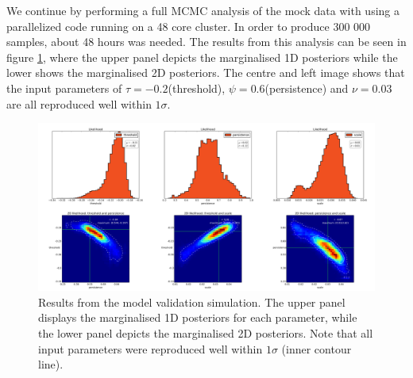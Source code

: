 \documentclass[aps,pre,twocolumn,letterpaper,floatfix,showpacs]{revtex4}
\begin{document}
We continue by performing a full MCMC analysis of the mock data with using a parallelized code running on a 48 core cluster. In order to produce 300 000 samples, about 48 hours was needed. The results from this analysis can be seen in figure \ref{fig:mockdataresults_pts}, where the upper panel depicts the marginalised 1D posteriors while the lower shows the marginalised 2D posteriors. The centre and left image shows that the input parameters of $\tau=-0.2$(threshold), $\psi=0.6$(persistence) and $\nu=0.03$ are all reproduced well within $1 \sigma$.


\begin{figure}
\includegraphics[width=.99\textwidth]{mock_data_results_pts.png}
\caption{Results from the model validation simulation. The upper panel displays the marginalised 1D posteriors for each parameter, while the lower panel depicts the marginalised 2D posteriors. Note that all input parameters were reproduced well within $1\sigma$ (inner contour line).}
\label{fig:mockdataresults_pts}
\end{figure}
\end{document}

